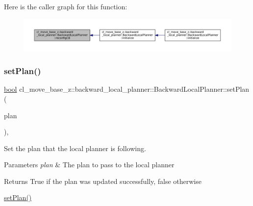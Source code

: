 Here is the caller graph for this function\+:
\nopagebreak
\begin{figure}[H]
\begin{center}
\leavevmode
\includegraphics[width=350pt]{classcl__move__base__z_1_1backward__local__planner_1_1BackwardLocalPlanner_a62e4783adae03ce92190d855a021b91d_icgraph}
\end{center}
\end{figure}
\mbox{\label{classcl__move__base__z_1_1backward__local__planner_1_1BackwardLocalPlanner_ab11a0eec45f24b5a5a3987a50427eed4}} 
\subsubsection{\texorpdfstring{set\+Plan()}{setPlan()}}
{\footnotesize\ttfamily \hyperlink{classbool}{bool} cl\+\_\+move\+\_\+base\+\_\+z\+::backward\+\_\+local\+\_\+planner\+::\+Backward\+Local\+Planner\+::set\+Plan (\begin{DoxyParamCaption}\item[{const std\+::vector$<$ geometry\+\_\+msgs\+::\+Pose\+Stamped $>$ \&}]{plan }\end{DoxyParamCaption})\hspace{0.3cm}{\ttfamily [override]}, {\ttfamily [virtual]}}



Set the plan that the local planner is following. 


\begin{DoxyParams}{Parameters}
{\em plan} & The plan to pass to the local planner \\
\hline
\end{DoxyParams}
\begin{DoxyReturn}{Returns}
True if the plan was updated successfully, false otherwise
\end{DoxyReturn}
\hyperlink{classcl__move__base__z_1_1backward__local__planner_1_1BackwardLocalPlanner_ab11a0eec45f24b5a5a3987a50427eed4}{set\+Plan()} 

